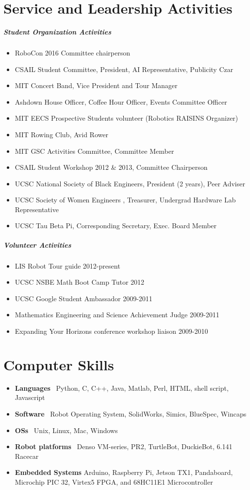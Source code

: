 \documentclass[10pt,letterpaper]{article}
\begin{document}
\section*{Service and Leadership Activities}
\subparagraph{Student Organization Activities}
\begin{itemize}
	\item RoboCon 2016 Committee chairperson 
	\item CSAIL Student Committee, President, AI Representative, Publicity Czar  
	\item MIT Concert Band,  Vice President and Tour Manager 
	\item Ashdown House Officer,  Coffee Hour Officer, Events Committee Officer 
	\item MIT EECS Prospective Students volunteer (Robotics RAISINS Organizer)
	\item MIT Rowing Club,  Avid Rower 
	\item MIT GSC Activities Committee, Committee Member 
	\item CSAIL Student Workshop 2012 \& 2013, Committee Chairperson  
	\item UCSC National Society of Black Engineers,   President (2 years), Peer Adviser 
	\item UCSC Society of Women Engineers , Treasurer, Undergrad Hardware Lab Representative 
	\item UCSC Tau Beta Pi,  Corresponding Secretary, Exec. Board Member  
\end{itemize}
\subparagraph{Volunteer Activities}
\begin{itemize}     
  \item LIS Robot Tour guide 2012-present
	\item UCSC NSBE Math Boot Camp Tutor  2012     
	\item UCSC Google Student Ambassador  2009-2011  
	\item Mathematics Engineering and Science Achievement Judge   2009-2011  
	\item Expanding Your Horizons conference workshop liaison  2009-2010
\end{itemize}


\section*{Computer Skills}

\begin{itemize}
	\item \textbf{Languages} \ Python, C, C++, Java, Matlab, Perl, HTML, shell script, Javascript
	\item \textbf{Software} \ Robot Operating System, SolidWorks, Simics, BlueSpec, Wincaps
	\item \textbf{OSs} \ Unix, Linux,  Mac, Windows
	\item \textbf{Robot platforms} \ Denso VM-series, PR2, TurtleBot, DuckieBot, 6.141 Racecar
	\item \textbf{Embedded Systems} Arduino, Raspberry Pi, Jetson TX1, Pandaboard, Microchip PIC 32, Virtex5 FPGA, and  68HC11E1 Microcontroller 
\end{itemize}
\end{document}
